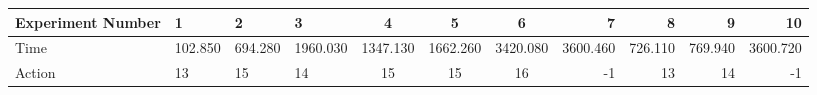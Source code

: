 \documentclass[8pt]{article}
\begin{document}
\begin{landscape}
\begin{tabular}{ | l | l | l | l | c | c | c | r | r | r | r | }
 \hline 
Experiment Number & 1 & 2 & 3 & 4 & 5 & 6 & 7 & 8 & 9 & 10\\ \hline
Time & 102.850 & 694.280 & 1960.030 & 1347.130 & 1662.260 & 3420.080 & 3600.460 & 726.110 & 769.940 & 3600.720\\ \hline
Action & 13 & 15 & 14 & 15 & 15 & 16 & -1 & 13 & 14 & -1\\ \hline\end{tabular}
\end{landscape}
\end{document}
